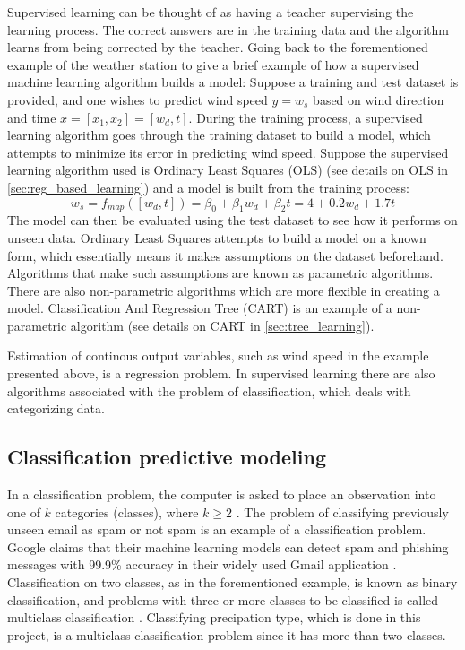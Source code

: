 
	Supervised learning can be thought of as having a teacher supervising the learning process. The correct answers are in the training data and the algorithm learns from being corrected by the teacher. Going back to the forementioned example of the weather station to give a brief example of how a supervised machine learning algorithm builds a model: Suppose a training and test dataset is provided, and one wishes to predict wind speed $y = w_s$ based on wind direction and time $x = [x_1, x_2] = [w_d, t]$. During the training process, a supervised learning algorithm goes through the training dataset to build a model, which attempts to minimize its error in predicting wind speed. Suppose the supervised learning algorithm used is Ordinary Least Squares (OLS) (see details on OLS in \ref{sec:reg_based_learning}) and a model is built from the training process: 
\begin{equation} \label{eq:example_ws}
	w_s = f_{map}([w_d, t]) = \beta_0 + \beta_1 w_d + \beta_2 t = 4 + 0.2w_d + 1.7t
\end{equation}
	The model can then be evaluated using the test dataset to see how it performs on unseen data. Ordinary Least Squares attempts to build a model on a known form, which essentially means it makes assumptions on the dataset beforehand. Algorithms that make such assumptions are known as parametric algorithms. There are also non-parametric algorithms which are more flexible in creating a model. Classification And Regression Tree (CART) is an example of a non-parametric algorithm (see details on CART in \ref{sec:tree_learning}). %

	Estimation of continous output variables, such as wind speed in the example presented above, is a regression problem. In supervised learning there are also algorithms associated with the problem of classification, which deals with categorizing data.


	\subsection{Classification predictive modeling} \label{sec:classification}
	In a classification problem, the computer is asked to place an observation into one of $k$ categories (classes), where $k \geq 2$ \cite{BOOK:1}. The problem of classifying previously unseen email as spam or not spam is an example of a classification problem. Google claims that their machine learning models can detect spam and phishing messages with 99.9\% accuracy in their widely used Gmail application \cite{WEBSITE:4}. Classification on two classes, as in the forementioned example, is known as binary classification, and problems with three or more classes to be classified is called multiclass classification \cite{MISC:1}. Classifying precipation type, which is done in this project, is a multiclass classification problem since it has more than two classes.

